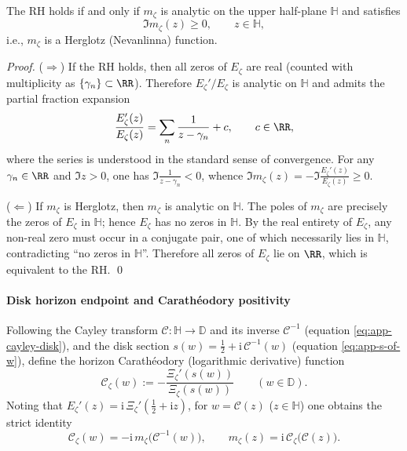 \begin{theorem}\label{thm:app-horizon-weyl-herglotz}
The RH holds if and only if \(m_{\zeta}\) is analytic on the upper half-plane \(\mathbb{H}\) and satisfies
\[
\Im m_{\zeta}(z)\ge 0,\qquad z\in\mathbb{H},
\]
i.e., \(m_{\zeta}\) is a Herglotz (Nevanlinna) function.
\end{theorem}

\begin{proof}
(\(\Rightarrow\)) If the RH holds, then all zeros of \(E_{\zeta}\) are real (counted with multiplicity as \(\{\gamma_n\}\subset\RR\)).
Therefore \(E_{\zeta}'/E_{\zeta}\) is analytic on \(\mathbb{H}\) and admits the partial fraction expansion
\[
\frac{E_{\zeta}'(z)}{E_{\zeta}(z)}=\sum_n\frac{1}{z-\gamma_n}+c,
\qquad c\in\RR,
\]
where the series is understood in the standard sense of convergence.
For any \(\gamma_n\in\RR\) and \(\Im z>0\), one has \(\Im\frac{1}{z-\gamma_n}<0\), whence
\(\Im m_{\zeta}(z)=-\Im\frac{E_{\zeta}'(z)}{E_{\zeta}(z)}\ge 0\).
\par
(\(\Leftarrow\)) If \(m_{\zeta}\) is Herglotz, then \(m_{\zeta}\) is analytic on \(\mathbb{H}\).
The poles of \(m_{\zeta}\) are precisely the zeros of \(E_{\zeta}\) in \(\mathbb{H}\); hence \(E_{\zeta}\) has no zeros in \(\mathbb{H}\).
By the real entirety of \(E_{\zeta}\), any non-real zero must occur in a conjugate pair, one of which necessarily lies in \(\mathbb{H}\), contradicting ``no zeros in \(\mathbb{H}\)''.
Therefore all zeros of \(E_{\zeta}\) lie on \(\RR\), which is equivalent to the RH. \qed
\end{proof}

\paragraph{Disk horizon endpoint and Carath\'eodory positivity}
Following the Cayley transform \(\mathcal{C}:\mathbb{H}\to\mathbb{D}\) and its inverse \(\mathcal{C}^{-1}\) (equation \eqref{eq:app-cayley-disk}), and the disk section \(s(w)=\tfrac12+\mathrm{i}\,\mathcal{C}^{-1}(w)\) (equation \eqref{eq:app-s-of-w}), define the horizon Carath\'eodory (logarithmic derivative) function
\begin{equation}\label{eq:app-horizon-carath-def}
\boxed{\;
\mathscr{C}_{\zeta}(w):=-\frac{\Xi_{\zeta}'(s(w))}{\Xi_{\zeta}(s(w))}\qquad(w\in\mathbb{D}).\;}
\end{equation}
Noting that \(E_{\zeta}'(z)=\mathrm{i}\,\Xi_{\zeta}'(\tfrac12+\mathrm{i}z)\), for \(w=\mathcal{C}(z)\) (\(z\in\mathbb{H}\)) one obtains the strict identity
\begin{equation}\label{eq:app-horizon-m-c-relation}
\boxed{\;
\mathscr{C}_{\zeta}(w)=-\mathrm{i}\,m_{\zeta}\!\bigl(\mathcal{C}^{-1}(w)\bigr),\qquad
m_{\zeta}(z)=\mathrm{i}\,\mathscr{C}_{\zeta}\!\bigl(\mathcal{C}(z)\bigr).\;}
\end{equation}

